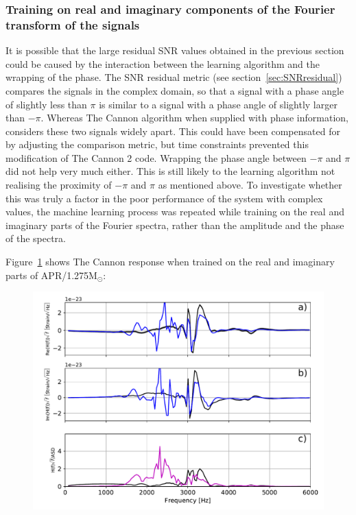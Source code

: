 \subsubsection{Training on real and imaginary components of the Fourier transform of the signals}
It is possible that the large residual SNR values obtained in the previous section could be caused by the interaction between the learning algorithm and the wrapping of the phase. The SNR residual metric (see section~\ref{sec:SNRresidual}) compares the signals in the complex domain, so that a signal with a phase angle of slightly less than $\pi$ is similar to a signal with a phase angle of slightly larger than $-\pi$. Whereas The Cannon algorithm when supplied with phase information, considers these two signals widely apart. This could have been compensated for by adjusting the comparison metric, but time constraints prevented this modification of The Cannon 2 code. Wrapping the phase angle between $-\pi$ and $\pi$ did not help very much either. This is still likely to the learning algorithm not realising the proximity of $-\pi$ and $\pi$ as mentioned above. To investigate whether this was truly a factor in the poor performance of the system with complex values, the machine learning process was repeated while training on the real and imaginary parts of the Fourier spectra, rather than the amplitude and the phase of the spectra. \par
Figure~\ref{fig:CannonReImAPR4-q10-M1275} shows The Cannon response when trained on the real and imaginary parts of APR/1.275M$_\odot$: 
\begin{figure}[H]
	\includegraphics[width=15cm]{./img/CannonReImAPR4-q10-M1275.pdf} 
	\caption[\protect]{\protect}
	\label{fig:CannonReImAPR4-q10-M1275}
\end{figure}

